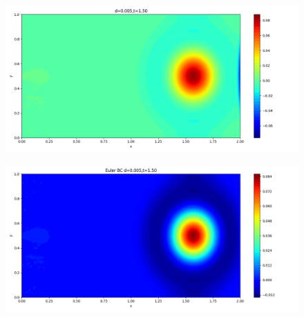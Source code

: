\documentclass[12pt]{article}
\begin{document}
\begin{figure}[H]
\begin{minipage}{\linewidth}
\begin{minipage}{0.5\textwidth}
\includegraphics[width=\linewidth]{figures/3d0.005t1.50.png}
\label{fig7}
\end{minipage}\hfill
\begin{minipage}{0.5\textwidth}
\includegraphics[width=\linewidth]{figures/3Ed0.005t1.50.png}
\label{fig8}
\end{minipage}
\vspace{-1.5em}


\end{minipage}
\end{figure}
\end{document}
